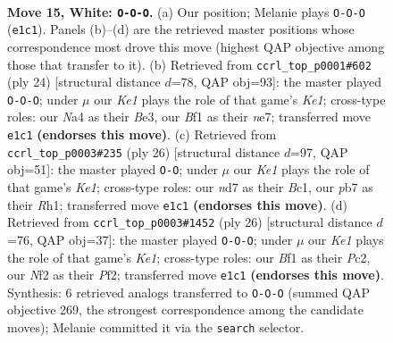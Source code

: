 \documentclass[11pt]{article}
\begin{document}
\clearpage

\begin{figure}[p]\centering
\begin{subfigure}{0.46\textwidth}\centering
\resizebox{\linewidth}{!}{%
\newchessgame
\chessboard[
  setfen={rnb3kr/1ppn4/4p3/p2p3p/N2P3q/5Q2/PPP2NPP/R3KB1R w KQ - 2 15},
  showmover=false,
  pgfstyle=straightmove, color=movearrow, markmove={e1-c1}
]}
\caption{}
\end{subfigure}\hfill
\begin{subfigure}{0.46\textwidth}\centering
\resizebox{\linewidth}{!}{%
\newchessgame
\chessboard[
  setfen={r3kb1r/p3nppp/2p1p3/q3P3/3Q4/2N1BP2/PP3P1P/R3K2R w KQkq - 2 13},
  showmover=false,
  pgfstyle=straightmove, color=movearrow, markmove={e1-c1}
]}
\caption{}
\end{subfigure}
\\[4pt]
\begin{subfigure}{0.46\textwidth}\centering
\resizebox{\linewidth}{!}{%
\newchessgame
\chessboard[
  setfen={r2nk2r/pp1bb1pp/3pp3/q7/P7/1QPB1N1P/5PP1/R1B1K2R w KQkq - 2 14},
  showmover=false,
  pgfstyle=straightmove, color=movearrow, markmove={e1-g1}
]}
\caption{}
\end{subfigure}\hfill
\begin{subfigure}{0.46\textwidth}\centering
\resizebox{\linewidth}{!}{%
\newchessgame
\chessboard[
  setfen={r1b1k2r/pp1n1p2/2p1p3/5p2/3P3q/2N5/PPP1QPBP/R3K2R w KQkq - 0 14},
  showmover=false,
  pgfstyle=straightmove, color=movearrow, markmove={e1-c1}
]}
\caption{}
\end{subfigure}
\caption{\textbf{Move 15, White: \texttt{O-O-O}.} (a) Our position; Melanie plays \texttt{O-O-O} (\texttt{e1c1}). Panels (b)--(d) are the retrieved master positions whose correspondence most drove this move (highest QAP objective among those that transfer to it). (b) Retrieved from \texttt{ccrl\_top\_p0001\#602} (ply 24) [structural distance $d$=78, QAP obj=93]: the master played \texttt{O-O-O}; under $\mu$ our \emph{Ke1} plays the role of that game's \emph{Ke1}; cross-type roles: our \emph{N}a4 as their \emph{B}e3, our \emph{B}f1 as their \emph{n}e7; transferred move \texttt{e1c1} \textbf{(endorses this move)}. (c) Retrieved from \texttt{ccrl\_top\_p0003\#235} (ply 26) [structural distance $d$=97, QAP obj=51]: the master played \texttt{O-O}; under $\mu$ our \emph{Ke1} plays the role of that game's \emph{Ke1}; cross-type roles: our \emph{n}d7 as their \emph{B}c1, our \emph{p}b7 as their \emph{R}h1; transferred move \texttt{e1c1} \textbf{(endorses this move)}. (d) Retrieved from \texttt{ccrl\_top\_p0003\#1452} (ply 26) [structural distance $d$=76, QAP obj=37]: the master played \texttt{O-O-O}; under $\mu$ our \emph{Ke1} plays the role of that game's \emph{Ke1}; cross-type roles: our \emph{B}f1 as their \emph{P}c2, our \emph{N}f2 as their \emph{P}f2; transferred move \texttt{e1c1} \textbf{(endorses this move)}. Synthesis: 6 retrieved analogs transferred to \texttt{O-O-O} (summed QAP objective 269, the strongest correspondence among the candidate moves); Melanie committed it via the \texttt{search} selector.}
\label{fig:thought-m28}
\end{figure}
\end{document}

